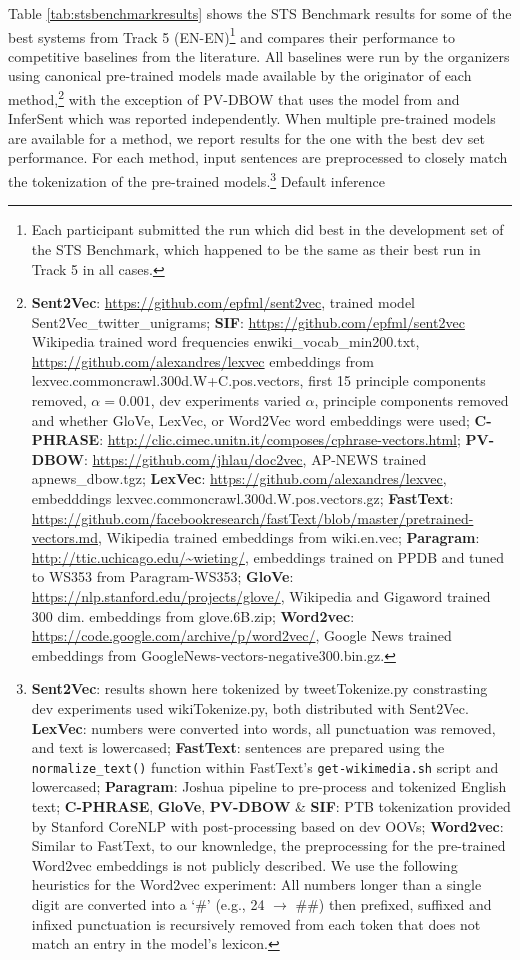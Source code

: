 \documentclass[11pt,a4paper]{article}
\begin{document}
Table \ref{tab:stsbenchmarkresults} shows the STS Benchmark results for some of the best systems from Track 5 (EN-EN)\footnote{Each participant submitted the run which did best in the development set of the STS Benchmark, which happened to be the same as their best run in Track 5 in all cases.} and compares their performance to competitive baselines from the literature. All baselines were run by the organizers using canonical pre-trained models made available by the originator of each method,\footnote{{\bf Sent2Vec}: \url{https://github.com/epfml/sent2vec}, trained model Sent2Vec\_twitter\_unigrams; {\bf SIF}: \url{https://github.com/epfml/sent2vec} Wikipedia trained word frequencies enwiki\_vocab\_min200.txt, \url{https://github.com/alexandres/lexvec} embeddings from lexvec.commoncrawl.300d.W+C.pos.vectors, first 15 principle components removed, $\alpha = 0.001$, dev experiments varied $\alpha$, principle components removed and whether GloVe, LexVec, or Word2Vec word embeddings were used; {\bf C-PHRASE}: \url{http://clic.cimec.unitn.it/composes/cphrase-vectors.html}; {\bf PV-DBOW}: \url{https://github.com/jhlau/doc2vec}, {\sc AP-NEWS} trained apnews\_dbow.tgz; {\bf LexVec}: \url{https://github.com/alexandres/lexvec}, embedddings lexvec.commoncrawl.300d.W.pos.vectors.gz; {\bf FastText}: \url{https://github.com/facebookresearch/fastText/blob/master/pretrained-vectors.md}, Wikipedia trained embeddings from wiki.en.vec; {\bf Paragram}: \url{http://ttic.uchicago.edu/~wieting/}, embeddings trained on PPDB and tuned to WS353 from Paragram-WS353; {\bf GloVe}: \url{https://nlp.stanford.edu/projects/glove/}, Wikipedia and Gigaword trained 300 dim. embeddings from glove.6B.zip; {\bf Word2vec}: \url{https://code.google.com/archive/p/word2vec/}, Google News trained embeddings from GoogleNews-vectors-negative300.bin.gz.} with the exception of PV-DBOW that uses the model from   and InferSent which was reported independently. When multiple pre-trained models are available for a method, we report results for the one with the best dev set performance. For each method, input sentences are preprocessed to closely match the tokenization of the pre-trained models.\footnote{{\bf Sent2Vec}: results shown here tokenized by tweetTokenize.py constrasting dev experiments used wikiTokenize.py, both distributed with Sent2Vec. {\bf LexVec}: numbers were converted into words, all punctuation was removed, and text is lowercased; {\bf FastText}: sentences are prepared using the \texttt{normalize\_text()} function within FastText's \texttt{get-wikimedia.sh} script and lowercased; {\bf Paragram}: Joshua \cite{post2015} pipeline to pre-process and tokenized English text; {\bf C-PHRASE}, {\bf GloVe}, {\bf PV-DBOW} \& {\bf SIF}: PTB tokenization provided by Stanford CoreNLP \cite{manning-EtAl:2014:P14-5} with post-processing based on dev OOVs; {\bf Word2vec}: Similar to FastText, to our knownledge, the preprocessing for the pre-trained Word2vec embeddings is not publicly described. We use the following heuristics for the Word2vec experiment: All numbers longer than a single digit are converted into a `\#' (e.g., 24 $\rightarrow$ \#\#) then prefixed, suffixed and infixed punctuation is recursively removed from each token that does not match an entry in the model's  lexicon.} Default inference 
\end{document}
